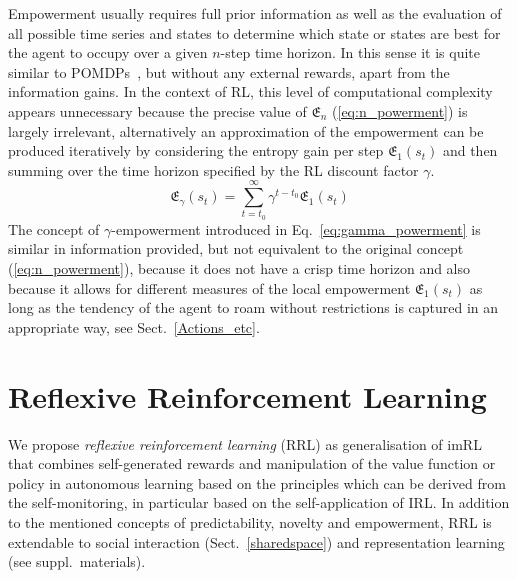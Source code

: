 \documentclass{article}
\begin{document}
Empowerment usually requires full prior information as well as the evaluation of all possible time series and states to determine which state or states are best for the agent to occupy over a given $n$-step time horizon. In this sense it is quite similar to POMDPs~\cite{kaelbling1998planning}, 
but without any external rewards, apart from the information gains.
In the context of RL, this level of computational complexity appears unnecessary because the precise value of $\mathfrak{E}_{n}$ (\ref{eq:n_powerment}) is largely irrelevant, alternatively an approximation of the empowerment can be produced iteratively by considering the entropy gain per step 
$\mathfrak{E}_{1}\left(s_{t}\right)$ and then summing over the time
horizon specified by the RL discount factor $\gamma$.
\begin{equation}
	\mathfrak{E}_{\gamma}\left(s_{t}\right)=\sum_{t=t_0}^\infty
	\gamma^{t-t_0}\mathfrak{E}_{1}\left(s_{t}\right)
	\label{eq:gamma_powerment}
\end{equation}
The concept of $\gamma$-empowerment introduced in 
Eq.~\ref{eq:gamma_powerment} is similar in information provided, but not equivalent to the original 
concept (\ref{eq:n_powerment}), because it does not have a 
crisp time horizon and also because it allows for different 
measures of the local empowerment 
$\mathfrak{E}_{1}\left(s_{t}\right)$ as long as 
the tendency of the agent to roam without restrictions is captured in
an appropriate way, see Sect.~\ref{Actions_etc}.

\section{Reflexive Reinforcement Learning} \label{reflexive}
We propose \emph{reflexive reinforcement learning} (RRL) as generalisation of
imRL that combines self-generated rewards and manipulation of the
value function or policy in autonomous learning based on the principles which can be
derived from the self-monitoring, in particular based on the self-application of IRL.
In addition to the mentioned concepts of predictability, novelty and empowerment, RRL
is extendable to social interaction (Sect.~\ref{sharedspace}) and representation
learning (see suppl.~materials).
\end{document}
